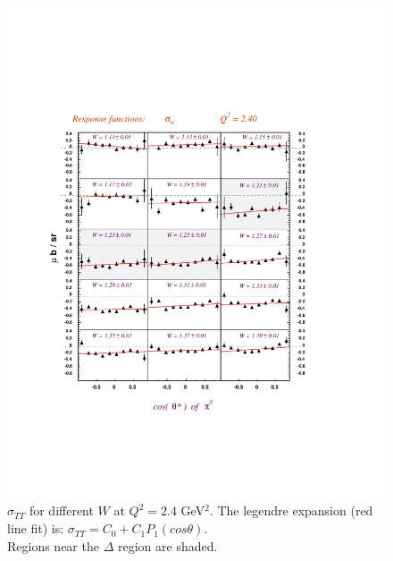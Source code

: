 \begin{figure}[h]
 \includegraphics[width = 15cm, bb=0 100 500 640]{analysis/img/Sigma_tt_Q2_2.40}
  \caption[$\sigma_{TT}$ for different $W$ at $Q^2 = 2.4$ GeV$^2$]
          { $\sigma_{TT}$ for different $W$ at $Q^2 = 2.4$ GeV$^2$. 
		     The legendre expansion (red line fit) is: 
		     $\sigma_{TT} = C_0 + C_1P_1(cos\theta)$.	  \\
	             Regions near the $\Delta $ region are shaded.}
 \label{fig:Sigma_tt_Q2_2.40}
\end{figure}


